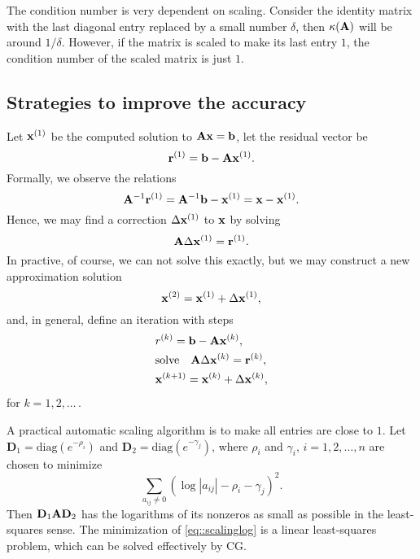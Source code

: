 \begin{exm}
    \label{exm::conditionnum}
    The condition number is very dependent on scaling. Consider 
    the identity matrix with the last diagonal entry replaced 
    by a small number $\delta$, then $\kappa({\mathbf{A}})$ will be 
    around $1/\delta$. However, if the matrix is scaled to make 
    its last entry $1$, the condition number of the scaled 
    matrix is just $1$.
\end{exm}

\subsection{Strategies to improve the accuracy}
\begin{alg}
    Let ${\mathbf{x}}^{(1)}$ be the computed solution to ${\mathbf{A}}{\mathbf{x}}=
    \mathbf{b}$, let the residual vector be
    $$
        \mathbf{r}^{(1)}=\mathbf{b}-{\mathbf{A}}{\mathbf{x}}^{(1)}.
    $$ 
    Formally, we observe the relations
    $$
        {\mathbf{A}}^{-1}\mathbf{r}^{(1)}={\mathbf{A}}^{-1}\mathbf{b}-{\mathbf{x}}^{(1)}
        ={\mathbf{x}}-{\mathbf{x}}^{(1)}.
    $$ 
    Hence, we may find a correction $\Delta{\mathbf{x}}^{(1)}$ to ${\mathbf{x}}$ 
    by solving 
    $$
        {\mathbf{A}}\Delta{\mathbf{x}}^{(1)}=\mathbf{r}^{(1)}.
    $$ 
    In practive, of course, we can not solve this exactly, but 
    we may construct a new approximation solution
    $$
        {\mathbf{x}}^{(2)}={\mathbf{x}}^{(1)}+\Delta {\mathbf{x}}^{(1)},
    $$ 
    and, in general, define an iteration with steps
    \begin{align*}
        &r^{(k)}=\mathbf{b}-{\mathbf{A}}{\mathbf{x}}^{(k)},\\
        &\textrm{solve}\quad{\mathbf{A}}\Delta {\mathbf{x}}^{(k)}=\mathbf{r}^{(k)},\\
        &{\mathbf{x}}^{(k+1)}={\mathbf{x}}^{(k)}+\Delta{\mathbf{x}}^{(k)},
    \end{align*}
    for $k=1,2,\ldots\,$.
\end{alg}

\begin{alg}
    \label{alg::autoscale1}
    A practical automatic scaling algorithm is to make all 
    entries are close to $1$. Let $\mathbf{D}_1=
    \mathrm{diag}(e^{-\rho_i})$ and $\mathbf{D}_2=\mathrm{diag}
    (e^{-\gamma_j})$, where $\rho_i$ and $\gamma_i,\,i=1,2,\ldots,
    n$ are chosen to  minimize
    \begin{equation}
        \label{eq::scalinglog}
        \sum_{a_{ij}\neq 0}(\log|a_{ij}|-\rho_i-\gamma_j)^2.
    \end{equation}
    Then $\mathbf{D}_1{\mathbf{A}}\mathbf{D}_2$ has the logarithms of 
    its nonzeros as small as possible in the least-squares 
    sense. The minimization of \eqref{eq::scalinglog} is a 
    linear least-squares problem, which can be solved 
    effectively by CG.
\end{alg}

